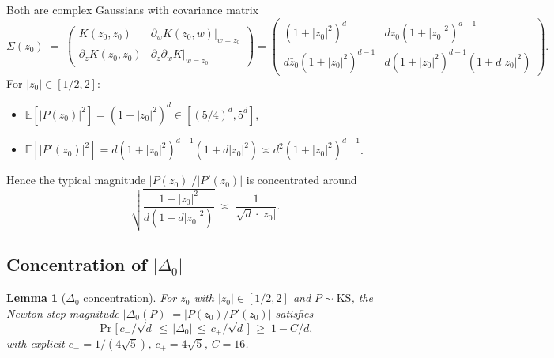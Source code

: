 \documentclass[11pt,a4paper]{article}
\newtheorem{lemma}[theorem]{Lemma}
\begin{document}
Both are complex Gaussians with covariance matrix
\begin{equation}\label{eq:cov-PP}
\Sigma(z_0) \;=\; \begin{pmatrix} K(z_0, z_0) & \partial_w K(z_0, w)|_{w=z_0} \\ \partial_{\bar z}K(z_0,z_0) & \partial_{\bar z}\partial_w K|_{w=z_0}\end{pmatrix}
= \begin{pmatrix}(1+|z_0|^2)^d & d z_0 (1+|z_0|^2)^{d-1} \\ d \bar z_0 (1+|z_0|^2)^{d-1} & d(1+|z_0|^2)^{d-1}(1 + d|z_0|^2)\end{pmatrix}.
\end{equation}
For $|z_0| \in [1/2, 2]$:
\begin{itemize}
\item $\mathbb E[|P(z_0)|^2] = (1 + |z_0|^2)^d \in [(5/4)^d, 5^d]$,
\item $\mathbb E[|P'(z_0)|^2] = d(1+|z_0|^2)^{d-1}(1 + d|z_0|^2) \asymp d^2 (1+|z_0|^2)^{d-1}$.
\end{itemize}
Hence the typical magnitude $|P(z_0)|/|P'(z_0)|$ is concentrated around
\begin{equation}\label{eq:beta-typical}
\sqrt{\frac{1+|z_0|^2}{d(1 + d|z_0|^2)}} \;\asymp\; \frac{1}{\sqrt d \cdot |z_0|}.
\end{equation}

\subsection{Concentration of $|\Delta_0|$}

\begin{lemma}[$\Delta_0$ concentration]\label{lem:Delta-conc}
For $z_0$ with $|z_0| \in [1/2, 2]$ and $P \sim \mathrm{KS}$, the Newton step magnitude $|\Delta_0(P)| = |P(z_0)/P'(z_0)|$ satisfies
\begin{equation}\label{eq:Delta-conc}
\Pr\!\bigl[\,c_-/\sqrt d \,\le\, |\Delta_0| \,\le\, c_+/\sqrt d\,\bigr] \;\ge\; 1 - C/d,
\end{equation}
with explicit $c_- = 1/(4\sqrt 5)$, $c_+ = 4\sqrt 5$, $C = 16$.
\end{lemma}
\end{document}
